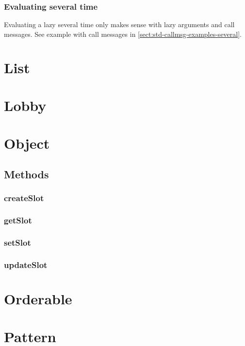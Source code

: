 \documentclass[openright,twoside,12pt]{report}
\newcommand{\sect}[1]{\autoref{sect:#1}}
\begin{document}
\subsubsection{Evaluating several time}

Evaluating a lazy several time only makes sense with lazy arguments
and call messages. See example with call messages in
\sect{std-callmsg-examples-several}.

\section{List}


\section{Lobby}
\section{Object}
\label{sect:std-object}

\subsection{Methods}

\subsubsection{createSlot}
\label{sect:std-object-createslot}

\subsubsection{getSlot}
\label{sect:std-object-getslot}

\subsubsection{setSlot}
\label{sect:std-object-setslot}

\subsubsection{updateSlot}
\label{sect:std-object-updateslot}

\section{Orderable}
\label{sect:std-orderable}
\section{Pattern}
\end{document}
